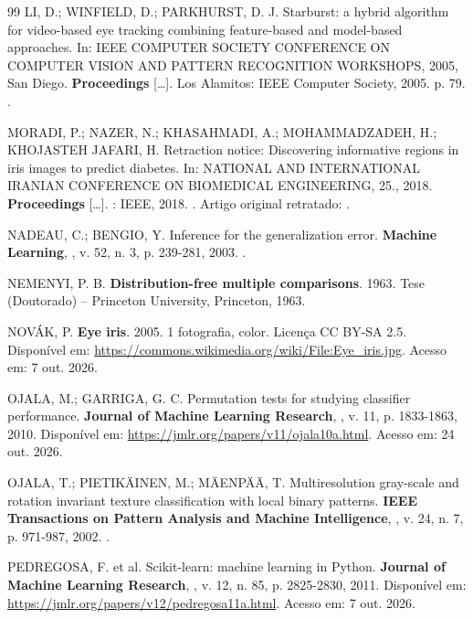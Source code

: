 \begin{thebibliography}{99}
LI, D.; WINFIELD, D.; PARKHURST, D. J. Starburst: a hybrid algorithm for
video-based eye tracking combining feature-based and model-based approaches.
In: IEEE COMPUTER SOCIETY CONFERENCE ON COMPUTER VISION AND PATTERN
RECOGNITION WORKSHOPS, 2005, San Diego. \textbf{Proceedings} [\dots].
Los Alamitos: IEEE Computer Society, 2005. p. 79.
.

MORADI, P.; NAZER, N.; KHASAHMADI, A.; MOHAMMADZADEH, H.; KHOJASTEH JAFARI, H.
Retraction notice: Discovering informative regions in iris images to predict
diabetes. In: NATIONAL AND INTERNATIONAL IRANIAN CONFERENCE ON BIOMEDICAL
ENGINEERING, 25., 2018. \textbf{Proceedings} [\dots]. \semlocal: IEEE, 2018.
. Artigo original retratado:
.

NADEAU, C.; BENGIO, Y. Inference for the generalization error.
\textbf{Machine Learning}, \semlocal, v. 52, n. 3, p. 239-281, 2003.
.

NEMENYI, P. B. \textbf{Distribution-free multiple comparisons}. 1963. Tese
(Doutorado) -- Princeton University, Princeton, 1963.

NOVÁK, P. \textbf{Eye iris}. 2005. 1 fotografia, color. Licença CC BY-SA 2.5.
Disponível em: \url{https://commons.wikimedia.org/wiki/File:Eye_iris.jpg}.
Acesso em: 7 out. 2026.

OJALA, M.; GARRIGA, G. C. Permutation tests for studying classifier
performance. \textbf{Journal of Machine Learning Research}, \semlocal,
v. 11, p. 1833-1863, 2010. Disponível em:
\url{https://jmlr.org/papers/v11/ojala10a.html}. Acesso em: 24 out. 2026.

OJALA, T.; PIETIKÄINEN, M.; MÄENPÄÄ, T. Multiresolution gray-scale and
rotation invariant texture classification with local binary patterns.
\textbf{IEEE Transactions on Pattern Analysis and Machine Intelligence},
\semlocal, v. 24, n. 7, p. 971-987, 2002. .

PEDREGOSA, F. et al. Scikit-learn: machine learning in Python.
\textbf{Journal of Machine Learning Research}, \semlocal, v. 12, n. 85,
p. 2825-2830, 2011. Disponível em:
\url{https://jmlr.org/papers/v12/pedregosa11a.html}. Acesso em: 7 out. 2026.


\end{thebibliography}
